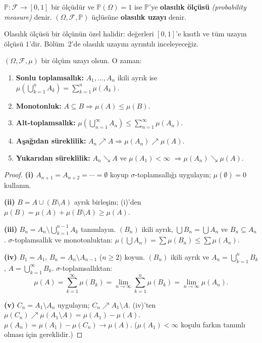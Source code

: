 \begin{tanim}\label{def:olasilikolucu}
$\mathbb{P}: \mathcal{F} \to [0,1]$ bir ölçüdür ve $\mathbb{P}(\Omega) = 1$
ise $\mathbb{P}$'ye \textbf{olasılık ölçüsü} \emph{(probability measure)} denir.
$(\Omega, \mathcal{F}, \mathbb{P})$ üçlüsüne \textbf{olasılık uzayı} denir.
\end{tanim}

\begin{notkutu}
Olasılık ölçüsü bir ölçünün özel halidir: değerleri $[0,1]$'e kısıtlı ve
tüm uzayın ölçüsü $1$'dir. Bölüm~2'de olasılık uzayını ayrıntılı inceleyeceğiz.
\end{notkutu}

\begin{teorem}\label{thm:olcuozellik}
$(\Omega, \mathcal{F}, \mu)$ bir ölçüm uzayı olsun. O zaman:
\begin{enumerate}[label=(\roman*)]
  \item \textbf{Sonlu toplamsallık:} $A_1, \ldots, A_n$ ikili ayrık ise
        $\mu\!\left(\bigcup_{k=1}^n A_k\right) = \sum_{k=1}^n \mu(A_k)$.
  \item \textbf{Monotonluk:} $A \subseteq B \Rightarrow \mu(A) \leq \mu(B)$.
  \item \textbf{Alt-toplamsallık:} $\mu\!\left(\bigcup_{n=1}^\infty A_n\right)
        \leq \sum_{n=1}^\infty \mu(A_n)$.
  \item \textbf{Aşağıdan süreklilik:} $A_n \nearrow A \Rightarrow \mu(A_n) \nearrow \mu(A)$.
  \item \textbf{Yukarıdan süreklilik:} $A_n \searrow A$ ve $\mu(A_1) < \infty$
        $\Rightarrow \mu(A_n) \searrow \mu(A)$.
\end{enumerate}
\end{teorem}

\begin{proof}
\textbf{(i)} $A_{n+1} = A_{n+2} = \cdots = \emptyset$ koyup $\sigma$-toplamsallığı uygulayın;
$\mu(\emptyset) = 0$ kullanın.

\textbf{(ii)} $B = A \cup (B \setminus A)$ ayrık birleşim; (i)'den
$\mu(B) = \mu(A) + \mu(B \setminus A) \geq \mu(A)$.

\textbf{(iii)} $B_n = A_n \setminus \bigcup_{k=1}^{n-1} A_k$ tanımlayın.
$(B_n)$ ikili ayrık, $\bigcup B_n = \bigcup A_n$ ve $B_n \subseteq A_n$.
$\sigma$-toplamsallık ve monotonluktan:
$\mu(\bigcup A_n) = \sum \mu(B_n) \leq \sum \mu(A_n)$.

\textbf{(iv)} $B_1 = A_1$, $B_n = A_n \setminus A_{n-1}$ ($n \geq 2$) koyun.
$(B_n)$ ikili ayrık ve $A_n = \bigcup_{k=1}^n B_k$, $A = \bigcup_{k=1}^\infty B_k$.
$\sigma$-toplamsallıktan:
\[
  \mu(A) = \sum_{k=1}^\infty \mu(B_k) = \lim_{n\to\infty} \sum_{k=1}^n \mu(B_k) = \lim_{n\to\infty} \mu(A_n).
\]

\textbf{(v)} $C_n = A_1 \setminus A_n$ uygulayın; $C_n \nearrow A_1 \setminus A$.
(iv)'ten $\mu(C_n) \nearrow \mu(A_1 \setminus A) = \mu(A_1) - \mu(A)$.
$\mu(A_n) = \mu(A_1) - \mu(C_n) \to \mu(A)$.
($\mu(A_1) < \infty$ koşulu farkın tanımlı olması için gereklidir.)
\end{proof}

